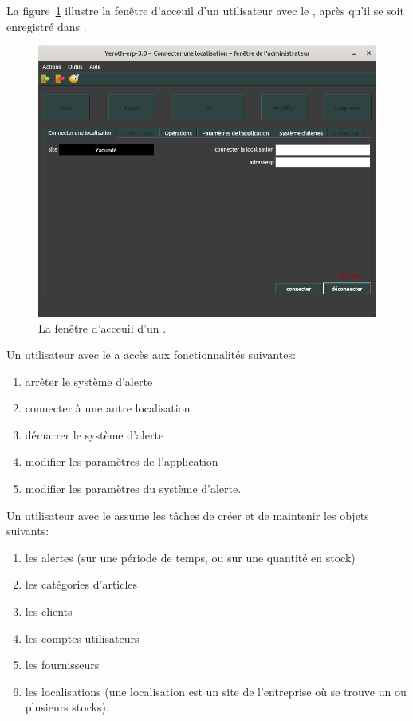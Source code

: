 \label{sec:utilisateurs-ladministrateur}

La figure~\ref{fig:fenetre-principale-admin} illustre la
fen\^etre d'acceuil d'un utilisateur avec le \role \admin,
apr\`es qu'il se soit enregistr\'e dans \yeroth.\\

\begin{figure}[!htbp]
\centering
\includegraphics[scale=0.63]{images/yeroth-fenetre-administrateur.png}
\caption{La fen\^etre d'acceuil d'un \admin.}
\label{fig:fenetre-principale-admin}
\end{figure}

Un utilisateur avec le \role \admin a acc\`es aux
fonctionnalit\'es suivantes:
\begin{enumerate}[1)]
	\item arr\^eter le syst\`eme d'alerte
	\item connecter \yerothpos \`a une autre localisation
	\item d\'emarrer le syst\`eme d'alerte
	\item modifier les param\`etres de l'application
	\item modifier les param\`etres du syst\`eme d'alerte.\\   
\end{enumerate}

Un utilisateur avec le \role \admin assume les
t\^aches de cr\'eer et de maintenir les objets suivants:
\begin{enumerate}[1)]
	\item les alertes (sur une p\'eriode de temps, ou sur une quantit\'e en stock)
	\item les cat\'egories d'articles
	\item les clients
	\item les comptes utilisateurs
	\item les fournisseurs				
	\item les localisations (une localisation est un site de
	      l'entreprise o\`u se trouve un ou plusieurs stocks).\\   
\end{enumerate}

